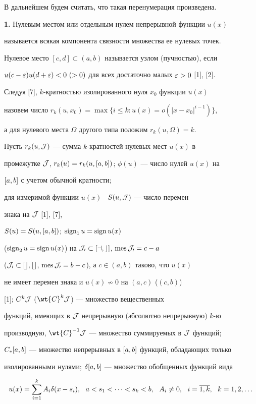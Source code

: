 В дальнейшем будем считать, что такая перенумерация произведена.


\medskip





{\bf 1.} Нулевым местом или отдельным нулем непрерывной функции $u(x)$


называется всякая компонента связности множества ее нулевых точек.


Нулевое место $[c,d]\subset (a,b)$ называется узлом (пучностью), если


$u(c-\varepsilon)u(d+\varepsilon)<0\ (>0)$ для всех достаточно малых $\varepsilon>0$ [1], [2].


Следуя [7], $k$-кратностью изолированного нуля $x_0$ функции $u(x)$


назовем число $r_k(u,x_0)=\max{\{i\le k:u(x)=o(|x-x_0|^{i-1})\}}$,


а для нулевого места $\Omega$ другого типа положим $r_k(u,\Omega)=k$.


Пусть $r_k(u,\cal J)$ --- сумма $k$-кратностей нулевых мест $u(x)$ в


промежутке $\cal J$, $r_k(u)=r_k(u,[a,b])$; $\phi(u)$ --- число нулей $u(x)$ на


$[a,b]$ с учетом обычной кратности;


для измеримой функции $u(x)$ \ $S(u,\cal J)$ --- число перемен 


знака на $\cal J$ [1], [7],


$S(u)=S(u,[a,b])$; $\operatorname{sign}_1 u=\operatorname{sign}{u(x)}$


($\operatorname{sign}_2 u=\operatorname{sign}{u(x)}$) на $\cal J_0\subset[a,c]$, $\operatorname{mes}{\cal J_0}=c-a$


($\cal J_0\subset[c,b]$, $\operatorname{mes}{\cal J_0}=b-c$), а $c\in(a,b)$ таково, что $u(x)$


не имеет перемен знака и $u(x)\not\sim 0$ на $(a,c)$ ($(c,b)$)


[1]; $C^k \cal J$ ($\wt{C}^k \j$) --- множество вещественных


функций, имеющих в $\cal J$ непрерывную (абсолютно непрерывную) $k$-ю


производную, $\wt{C}^{-1} \j$ --- множество суммируемых в $\cal J$ функций;


$C_{*}[a,b]$ --- множество непрерывных в $[a,b]$ функций, обладающих только


изолированными нулями; $\delta[a,b]$ --- множество обобщенных функций вида


\begin{equation}


u(x)=\sum_{i=1}^k A_i\delta(x-s_i),\ \ a<s_1<\dotsb<s_k<b,


\ \ A_i\ne 0,\ \ i=\o{1,k},\ \ k=1,2,\dotsc


\end{equation}


